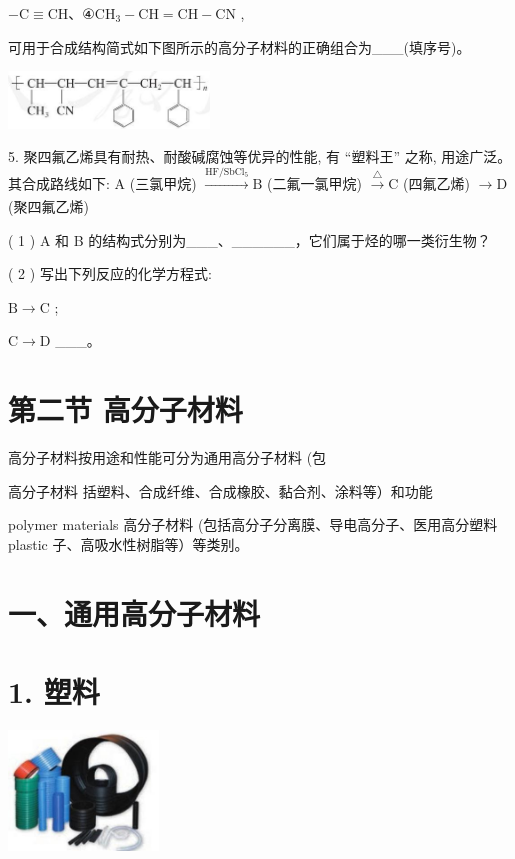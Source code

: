 \documentclass[10pt]{article}
\begin{document}
\(- \mathrm{C} \equiv \mathrm{{CH}}\text{、}\text{④}{\mathrm{{CH}}}_{3} - \mathrm{{CH}} = \mathrm{{CH}} - \mathrm{{CN}}\) ,

可用于合成结构简式如下图所示的高分子材料的正确组合为\_\_\_(填序号)。

\begin{center}
\includegraphics[max width=0.4\textwidth]{images/0190efc5-b58a-7c43-bfb0-e0a030df9cfd_140_644603.jpg}
\end{center}

5. 聚四氟乙烯具有耐热、耐酸碱腐蚀等优异的性能, 有 “塑料王” 之称, 用途广泛。其合成路线如下: \(\mathrm{A}\) (三氯甲烷) \(\xrightarrow[]{\mathrm{{HF}}/{\mathrm{{SbCl}}}_{5}}\mathrm{B}\) (二氟一氯甲烷) \(\xrightarrow[]{\bigtriangleup }\mathrm{C}\) (四氟乙烯) \(\rightarrow \mathrm{D}\) (聚四氟乙烯)

( 1 ) A 和 B 的结构式分别为\_\_\_、\_\_\_\_\_\_，它们属于烃的哪一类衍生物？

( 2 ) 写出下列反应的化学方程式:

\(\mathrm{B} \rightarrow \mathrm{C}\) ;

\(\mathrm{C} \rightarrow \mathrm{D}\) \_\_\_。

\section*{第二节 高分子材料}

高分子材料按用途和性能可分为通用高分子材料 (包

高分子材料 括塑料、合成纤维、合成橡胶、黏合剂、涂料等）和功能

polymer materials 高分子材料 (包括高分子分离膜、导电高分子、医用高分塑料 plastic 子、高吸水性树脂等）等类别。

\section*{一、通用高分子材料}

\section*{1. 塑料}

\begin{center}
\includegraphics[max width=0.3\textwidth]{images/0190efc5-b58a-7c43-bfb0-e0a030df9cfd_141_852996.jpg}
\end{center}
\end{document}
